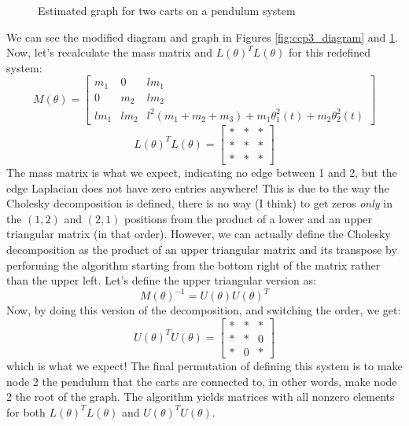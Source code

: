 \documentclass[conference]{IEEEtran}
\begin{document}
\begin{figure}[htbp]
    \centering
    \caption{Estimated graph for two carts on a pendulum system}
    \label{ccp3_graph}
\end{figure}

We can see the modified diagram and graph in Figures \ref{fig:ccp3_diagram} and \ref{ccp3_graph}. Now, let's recalculate the mass matrix and $L(\theta)^TL(\theta)$ for this redefined system:
$$
M(\theta)=\begin{bmatrix}m_{1} & 0 & l m_{1}\\0 & m_{2} & l m_{2}\\l m_{1} & l m_{2} & l^{2} \left(m_{1} + m_{2} + m_{3}\right) + m_{1} \theta_{1}^{2}{\left(t \right)} + m_{2} \theta_{2}^{2}{\left(t \right)}\end{bmatrix}
$$
$$
L(\theta)^TL(\theta)=\begin{bmatrix}
    * & * & *\\
    * & * & *\\
    * & * & *
\end{bmatrix}
$$
The mass matrix is what we expect, indicating no edge between 1 and 2, but the edge Laplacian does not have zero entries anywhere! This is due to the way the Cholesky decomposition is defined, there is no way (I think) to get zeros \textit{only} in the $(1,2)$ and $(2,1)$ positions from the product of a lower and an upper triangular matrix (in that order). However, we can actually define the Cholesky decomposition as the product of an upper triangular matrix and its transpose by performing the algorithm starting from the bottom right of the matrix rather than the upper left. Let's define the upper triangular version as:
$$
M(\theta)^{-1}=U(\theta)U(\theta)^T
$$
Now, by doing this version of the decomposition, and switching the order, we get:
$$
U(\theta)^TU(\theta)=\begin{bmatrix}
    * & * & *\\
    * & * & 0\\
    * & 0 & *
\end{bmatrix}
$$
which is what we expect! The final permutation of defining this system is to make node 2 the pendulum that the carts are connected to, in other words, make node 2 the root of the graph. The algorithm yields matrices with all nonzero elements for both $L(\theta)^TL(\theta)$ and $U(\theta)^TU(\theta)$.
\end{document}
